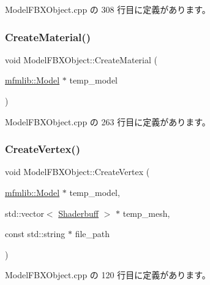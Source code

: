  Model\+F\+B\+X\+Object.\+cpp の 308 行目に定義があります。

\mbox{\label{class_model_f_b_x_object_a3fba4178f5a21dd3c180cb16f0a05106}} 
\subsubsection{\texorpdfstring{Create\+Material()}{CreateMaterial()}}
{\footnotesize\ttfamily void Model\+F\+B\+X\+Object\+::\+Create\+Material (\begin{DoxyParamCaption}\item[{\mbox{\hyperlink{classmfmlib_1_1_model}{mfmlib\+::\+Model}} $\ast$}]{temp\+\_\+model }\end{DoxyParamCaption})\hspace{0.3cm}{\ttfamily [private]}}



 Model\+F\+B\+X\+Object.\+cpp の 263 行目に定義があります。

\mbox{\label{class_model_f_b_x_object_a962ffe35009b920c09e2aaa3154051e4}} 
\subsubsection{\texorpdfstring{Create\+Vertex()}{CreateVertex()}}
{\footnotesize\ttfamily void Model\+F\+B\+X\+Object\+::\+Create\+Vertex (\begin{DoxyParamCaption}\item[{\mbox{\hyperlink{classmfmlib_1_1_model}{mfmlib\+::\+Model}} $\ast$}]{temp\+\_\+model,  }\item[{std\+::vector$<$ \mbox{\hyperlink{struct_model_f_b_x_object_1_1_shaderbuff}{Shaderbuff}} $>$ $\ast$}]{temp\+\_\+mesh,  }\item[{const std\+::string $\ast$}]{file\+\_\+path }\end{DoxyParamCaption})\hspace{0.3cm}{\ttfamily [private]}}



 Model\+F\+B\+X\+Object.\+cpp の 120 行目に定義があります。

